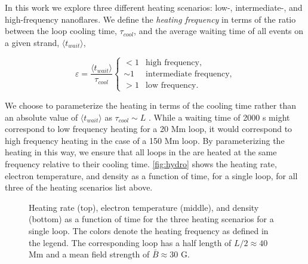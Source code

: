 In this work we explore three different heating scenarios: low-, intermediate-, and high-frequency nanoflares. We define the \textit{heating frequency} in terms of the ratio between the loop cooling time, $\tau_{cool}$, and the average waiting time of all events on a given strand, $\langle t_{wait}\rangle$,

\begin{equation}\label{eq:heating_types}
    \varepsilon = \frac{\langle t_{wait}\rangle}{\tau_{cool}}
    \begin{cases} 
        < 1 &  \text{high frequency},\\
        \sim1 & \text{intermediate frequency}, \\
        > 1 & \text{low frequency}.
     \end{cases}
\end{equation}

We choose to parameterize the heating in terms of the cooling time rather than an absolute value of $\langle t_{wait}\rangle$ as $\tau_{cool}\sim L$ \citep[see appendix]{cargill_active_2014}. While a waiting time of 2000 s might correspond to low frequency heating for a 20 Mm loop, it would correspond to high frequency heating in the case of a 150 Mm loop. By parameterizing the heating in this way, we ensure that all loops in the \AR{} are heated at the same frequency relative to their cooling time. \autoref{fig:hydro} shows the heating rate, electron temperature, and density as a function of time, for a single loop, for all three of the heating scenarios list above. 

\begin{figure}
    \caption{Heating rate (top), electron temperature (middle), and density (bottom) as a function of time for the three heating scenarios for a single loop. The colors denote the heating frequency as defined in the legend. The corresponding loop has a half length of $L/2\approx40$ Mm and a mean field strength of $\bar{B}\approx30$ G.}
    \label{fig:hydro}
\end{figure}

